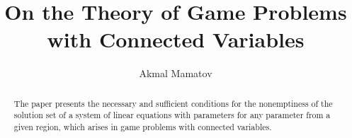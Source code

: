 \begin{englishtitle} %
\title{On the Theory of Game Problems with Connected  Variables}
\author{Akmal Mamatov %
}

\maketitle

\begin{abstract}
The paper presents the necessary and sufficient conditions for the nonemptiness of the solution set of a system of linear equations with parameters for any parameter from a given region, which arises in game problems with connected variables.

\end{abstract}
\end{englishtitle}

\iffalse

%
%

